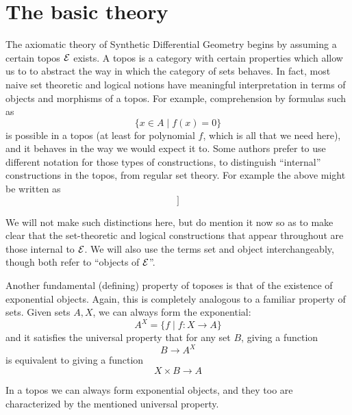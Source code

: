 \chapter{The basic theory} \label{sec:basictheory}

The axiomatic theory of Synthetic Differential Geometry begins by assuming a certain topos \( \mathcal{E} \) exists. A topos is a category with certain properties which allow us to to abstract the way in which the category of sets behaves. In fact, most naive set theoretic and logical notions have meaningful interpretation in terms of objects and morphisms of a topos. For example, comprehension by formulas such as
\begin{equation*}
  \{x\in A\mid f(x) = 0\}
\end{equation*}
is possible in a topos (at least for polynomial \( f \), which is all that we need here), and it behaves in the way we would expect it to. Some authors prefer to use different notation for those types of constructions, to distinguish ``internal'' constructions in the topos, from regular set theory. For example the above might be written as
\begin{equation*}
  [[x\in A\mid f(x) = 0]]
\end{equation*}

We will not make such distinctions here, but do mention it now so as to make clear that the set-theoretic and logical constructions that appear throughout are those internal to \( \mathcal{E} \). We will also use the terms set and object interchangeably, though both refer to ``objects of \( \mathcal{E} \)''.

Another fundamental (defining) property of toposes is that of the existence of exponential objects. Again, this is completely analogous to a familiar property of sets. Given sets \( A,X \), we can always form the exponential:
\begin{equation*}
  A^X = \{f\mid f:X\to A\}
\end{equation*}
and it satisfies the universal property that for any set \( B \), giving a function
\begin{equation*}
  B\to A^X
\end{equation*}
is equivalent to giving a function
\begin{equation*}
  X\times B\to A
\end{equation*}

In a topos we can always form exponential objects, and they too are characterized by the mentioned universal property.

